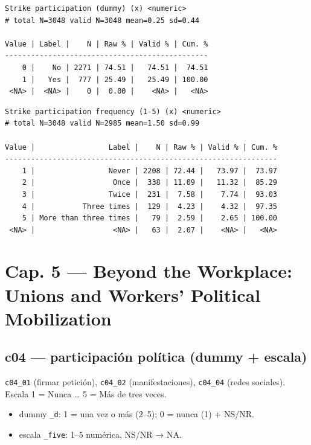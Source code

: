 \documentclass[
  letterpaper,
  DIV=11,
  numbers=noendperiod]{scrreprt}
\newenvironment{Shaded}{\begin{snugshade}}{\end{snugshade}}
\newcommand{\FunctionTok}[1]{\textcolor[rgb]{0.28,0.35,0.67}{#1}}
\newcommand{\NormalTok}[1]{\textcolor[rgb]{0.00,0.23,0.31}{#1}}
\newcommand{\SpecialCharTok}[1]{\textcolor[rgb]{0.37,0.37,0.37}{#1}}
\providecommand{\tightlist}{%
  \setlength{\itemsep}{0pt}\setlength{\parskip}{0pt}}
\begin{document}
\begin{verbatim}
Strike participation (dummy) (x) <numeric> 
# total N=3048 valid N=3048 mean=0.25 sd=0.44

Value | Label |    N | Raw % | Valid % | Cum. %
-----------------------------------------------
    0 |    No | 2271 | 74.51 |   74.51 |  74.51
    1 |   Yes |  777 | 25.49 |   25.49 | 100.00
 <NA> |  <NA> |    0 |  0.00 |    <NA> |   <NA>
\end{verbatim}

\begin{Shaded}
\end{Shaded}

\begin{verbatim}
Strike participation frequency (1-5) (x) <numeric> 
# total N=3048 valid N=2985 mean=1.50 sd=0.99

Value |                 Label |    N | Raw % | Valid % | Cum. %
---------------------------------------------------------------
    1 |                 Never | 2208 | 72.44 |   73.97 |  73.97
    2 |                  Once |  338 | 11.09 |   11.32 |  85.29
    3 |                 Twice |  231 |  7.58 |    7.74 |  93.03
    4 |           Three times |  129 |  4.23 |    4.32 |  97.35
    5 | More than three times |   79 |  2.59 |    2.65 | 100.00
 <NA> |                  <NA> |   63 |  2.07 |    <NA> |   <NA>
\end{verbatim}

\section{Cap. 5 --- Beyond the Workplace: Unions and Workers' Political
Mobilization}\label{cap.-5-beyond-the-workplace-unions-and-workers-political-mobilization}

\subsection{c04 --- participación política (dummy +
escala)}\label{c04-participaciuxf3n-poluxedtica-dummy-escala}

\texttt{c04\_01} (firmar petición), \texttt{c04\_02} (manifestaciones),
\texttt{c04\_04} (redes sociales). Escala 1 = Nunca \ldots{} 5 = Más de
tres veces.

\begin{itemize}
\tightlist
\item
  dummy \texttt{\_d}: 1 = una vez o más (2--5); 0 = nunca (1) + NS/NR.
\item
  escala \texttt{\_five}: 1--5 numérica, NS/NR → NA.
\end{itemize}
\end{document}
